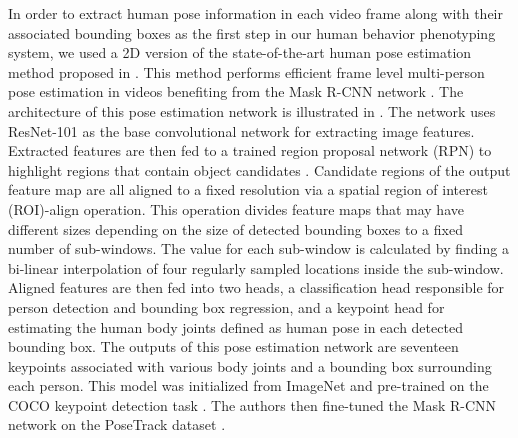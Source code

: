 
In order to extract human pose information in each video frame along with their associated bounding boxes as the first step in our human behavior phenotyping system, we used a 2D version of the state-of-the-art human pose estimation method proposed in \cite{girdhar2018detect}. This method performs efficient frame level multi-person pose estimation in videos benefiting from the Mask R-CNN network \cite{he2017mask}. The architecture of this pose estimation network is illustrated in . The network uses ResNet-101 \cite{he2016deep} as the base convolutional network for extracting image features. Extracted features are then fed to a trained region proposal network (RPN) to highlight regions that contain object candidates \cite{ren2017faster}. Candidate regions of the output feature map are all aligned to a fixed resolution via a spatial region of interest (ROI)-align operation. This operation divides feature maps that may have different sizes depending on the size of detected bounding boxes to a fixed number of sub-windows. The value for each sub-window is calculated by finding a bi-linear interpolation of four regularly sampled locations inside the sub-window. Aligned features are then fed into two heads, a classification head responsible for person detection and bounding box regression, and a keypoint head for estimating the human body joints defined as human pose in each detected bounding box. The outputs of this pose estimation network are seventeen keypoints associated with various body joints and a bounding box surrounding each person. This model was initialized from ImageNet \cite{deng2009imagenet} and pre-trained on the COCO keypoint detection task \cite{lin2014microsoft}. The authors then fine-tuned the Mask R-CNN network on the PoseTrack dataset \cite{andriluka2018posetrack}.

